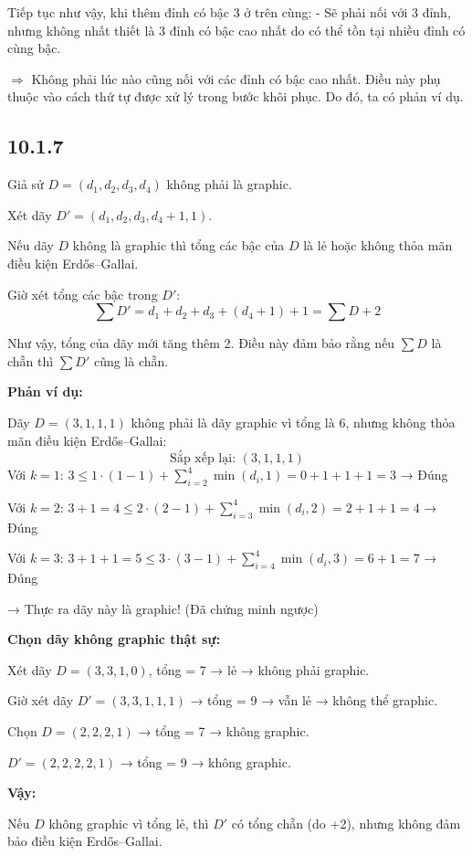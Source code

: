 \documentclass{article}
\begin{document}
	Tiếp tục như vậy, khi thêm đỉnh có bậc 3 ở trên cùng:
	- Sẽ phải nối với 3 đỉnh, nhưng không nhất thiết là 3 đỉnh có bậc cao nhất do có thể tồn tại nhiều đỉnh có cùng bậc.
	
	$\Rightarrow$ Không phải lúc nào cũng nối với các đỉnh có bậc cao nhất. Điều này phụ thuộc vào cách thứ tự được xử lý trong bước khôi phục. Do đó, ta có phản ví dụ.
	
	\subsection*{10.1.7}
	Giả sử $D = (d_1, d_2, d_3, d_4)$ không phải là graphic.
	
	Xét dãy $D' = (d_1, d_2, d_3, d_4 + 1, 1)$.
	
	Nếu dãy $D$ không là graphic thì tổng các bậc của $D$ là lẻ hoặc không thỏa mãn điều kiện Erdős–Gallai.
	
	Giờ xét tổng các bậc trong $D'$:
	\[
	\sum D' = d_1 + d_2 + d_3 + (d_4 + 1) + 1 = \sum D + 2
	\]
	
	Như vậy, tổng của dãy mới tăng thêm 2. Điều này đảm bảo rằng nếu $\sum D$ là chẵn thì $\sum D'$ cũng là chẵn.
	
	\textbf{Phản ví dụ:}
	
	Dãy $D = (3, 1, 1, 1)$ không phải là dãy graphic vì tổng là $6$, nhưng không thỏa mãn điều kiện Erdős–Gallai:
	\[
	\text{Sắp xếp lại: } (3,1,1,1)
	\]
	Với $k = 1$: $3 \leq 1 \cdot (1 - 1) + \sum_{i=2}^{4} \min(d_i, 1) = 0 + 1 + 1 + 1 = 3$ → Đúng
	
	Với $k = 2$: $3 + 1 = 4 \leq 2 \cdot (2 - 1) + \sum_{i=3}^{4} \min(d_i, 2) = 2 + 1 + 1 = 4$ → Đúng
	
	Với $k = 3$: $3 + 1 + 1 = 5 \leq 3 \cdot (3 - 1) + \sum_{i=4}^{4} \min(d_i, 3) = 6 + 1 = 7$ → Đúng
	
	→ Thực ra dãy này là graphic! (Đã chứng minh ngược)
	
	\textbf{Chọn dãy không graphic thật sự:}
	
	Xét dãy $D = (3,3,1,0)$, tổng = 7 → lẻ → không phải graphic.
	
	Giờ xét dãy $D' = (3,3,1,1,1)$ → tổng = 9 → vẫn lẻ → không thể graphic.
	
	Chọn $D = (2,2,2,1)$ → tổng = 7 → không graphic.
	
	$D' = (2,2,2,2,1)$ → tổng = 9 → không graphic.
	
	\textbf{Vậy:}
	
	Nếu $D$ không graphic vì tổng lẻ, thì $D'$ có tổng chẵn (do +2), nhưng không đảm bảo điều kiện Erdős–Gallai.
	
\end{document}

